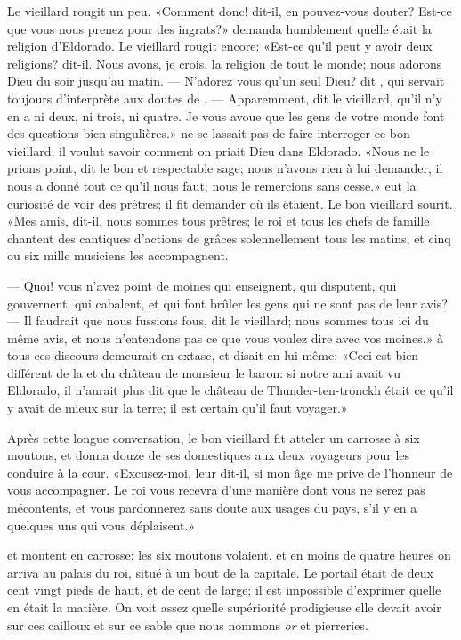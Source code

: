 {%
Le vieillard rougit un peu. «Comment donc! dit-il, en pouvez-vous
douter? Est-ce que vous nous prenez pour des ingrats?»  demanda
humblement quelle était la religion d’Eldorado. Le vieillard rougit
encore: «Est-ce qu’il peut y avoir deux religions? dit-il. Nous avons,
je crois, la religion de tout le monde; nous adorons Dieu du soir
jusqu’au matin. — N’adorez vous qu’un seul Dieu? dit , qui servait
toujours d’interprète aux doutes de . — Apparemment, dit le
vieillard, qu’il n’y en a ni deux, ni trois, ni quatre. Je vous avoue
que les gens de votre monde font des questions bien singulières.»
 ne se lassait pas de faire interroger ce bon vieillard; il
voulut savoir comment on priait Dieu dans Eldorado. «Nous ne le prions
point, dit le bon et respectable sage; nous n’avons rien à lui
demander, il nous a donné tout ce qu’il nous faut; nous le remercions
sans cesse.»  eut la curiosité de voir des prêtres; il fit
demander où ils étaient. Le bon vieillard sourit. «Mes amis, dit-il,
nous sommes tous prêtres; le roi et tous les chefs de famille chantent
des
cantiques d’actions de grâces solennellement tous les matins, et
cinq ou six mille musiciens les accompagnent. 

— Quoi! vous n’avez point
de moines qui enseignent, qui disputent, qui gouvernent, qui cabalent,
et qui font brûler les gens qui ne sont pas de leur avis? — Il faudrait
que nous fussions fous, dit le vieillard; nous sommes tous ici du même
avis, et nous n’entendons pas ce que vous voulez dire avec vos moines.»
 à tous ces discours demeurait en extase, et disait en lui-même:
«Ceci est bien différent de la  et du château de monsieur le
baron: si notre ami  avait vu Eldorado, il n’aurait plus dit
que le château de Thunder-ten-tronckh était ce qu’il y avait de mieux
sur la terre; il est certain qu’il faut voyager.»


Après cette longue conversation, le bon vieillard fit atteler un
carrosse à six moutons, et donna douze de ses domestiques aux deux
voyageurs pour les conduire à la cour. «Excusez-moi, leur dit-il, si mon
âge me prive de l’honneur de vous accompagner. Le roi vous recevra
d’une manière dont vous ne serez pas mécontents, et vous pardonnerez
sans doute aux usages du pays, s’il y en a quelques uns qui vous
déplaisent.»


 et  montent en carrosse; les six moutons volaient, et en
moins de quatre heures on arriva au palais du roi, situé à un bout de
la capitale. Le portail était de deux cent vingt pieds de haut, et de
cent de large; il est impossible d’exprimer quelle en était la matière.
On voit assez quelle supériorité prodigieuse elle devait avoir sur ces
cailloux et sur ce sable que nous nommons \emph{or} et {pierreries}.


}

